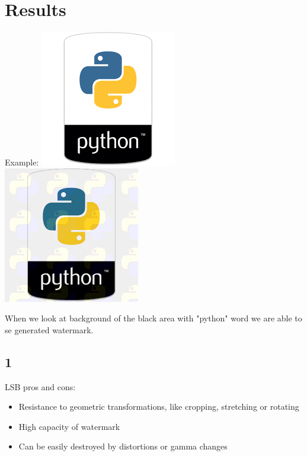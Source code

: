 \documentclass{article}
\begin{document}
	\subsection{}
\section{Results}

		
	Example:
	\includegraphics{python.png}
	\includegraphics{watermarked_python.png}
	
	When we look at background of the black area with "python" word we are able to se generated watermark.


	\subsection{1}
	
	LSB pros and cons:
	\begin{itemize}
		
		\item Resistance to geometric transformations, like cropping, stretching or rotating 
		\item High capacity of watermark
		\item Can be easily destroyed by distortions or gamma changes

	
	
	\end{itemize}	
	
\end{document}
